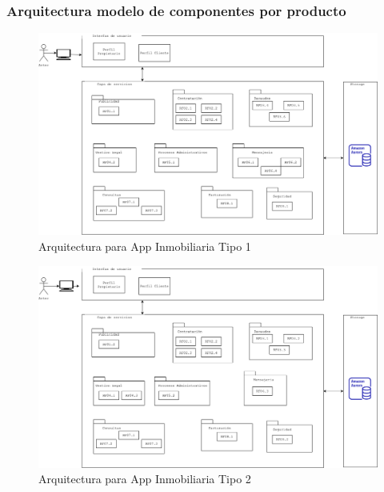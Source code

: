 \documentclass[letterpaper]{article}
\begin{document}
\subsubsection{Arquitectura modelo de componentes por producto}


\begin{figure}[ht]
    \centering
    \includegraphics[width=3.6 in]{images/Tipo 1.png}
    \caption{Arquitectura para App Inmobiliaria Tipo 1}
    \label{LPE}
\end{figure}
\FloatBarrier


\begin{figure}[ht]
    \centering
    \includegraphics[width=3.6 in]{images/Tipo 2.png}
    \caption{Arquitectura para App Inmobiliaria Tipo 2}
    \label{LPE}
\end{figure}
\FloatBarrier
\end{document}
